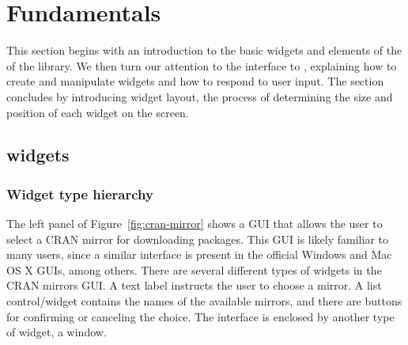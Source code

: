 \documentclass[article,shortnames]{jss}
\begin{document}
\section{Fundamentals}

This section begins with an introduction to the basic widgets and
elements of the of the  library.  We then turn our attention
to the  interface to , explaining how to
create and manipulate widgets and how to respond to user input. The
section concludes by introducing widget layout, the process of
determining the size and position of each widget on the screen.


\subsection[GTK+ widgets]{ widgets}

\subsubsection{Widget type hierarchy}



The left panel of Figure~\ref{fig:cran-mirror} shows a  GUI
that allows the user to select a CRAN mirror for downloading
 packages.  This GUI is likely familiar to many
 users, since a similar interface is present in the
official Windows and Mac OS X  GUIs, among others.  There
are several different types of widgets in the CRAN mirrors GUI.  A
text label instructs the user to choose a mirror.  A list
control/widget contains the names of the available mirrors, and there
are buttons for confirming or canceling the choice.  The interface is
enclosed by another type of widget, a window.
\end{document}
